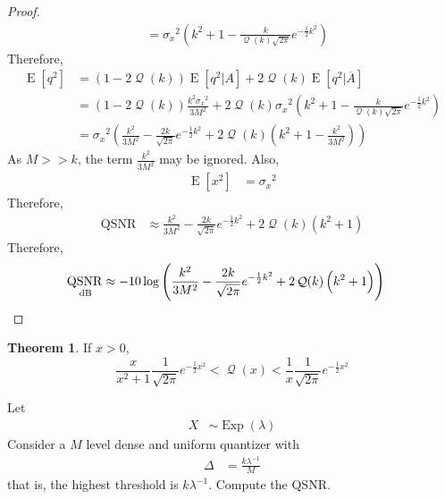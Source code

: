 \documentclass[titlepage, fleqn, a4paper, 12pt, twoside]{article}
\theoremstyle{definition}
\theoremstyle{theorem}
\newtheorem{theorem}{Theorem}
\DeclareMathOperator{\expct}{\mathrm{E}}
\DeclareMathOperator{\exponential}{\mathrm{Exp}}
\DeclareMathOperator{\QSNR}{\mathrm{QSNR}}
\DeclareMathOperator{\Q}{\mathcal{Q}}
\begin{document}
\begin{proof}
\begin{align*}
		&= {\sigma_x}^2 \left( k^2 + 1 - \frac{k}{\Q(k) \sqrt{2 \pi}} e^{-\frac{1}{2} k^2} \right)
	\end{align*}
	Therefore,
	\begin{align*}
		\expct\left[ q^2 \right] &= \left( 1 - 2 \Q(k) \right) \expct\left[ q^2 \Big| A \right] + 2 \Q(k) \expct\left[ q^2 \Big| \overline{A} \right]\\
		&= \left( 1 - 2 \Q(k) \right) \frac{k^2 {\sigma_x}^2}{3 M^2} + 2 \Q(k) {\sigma_x}^2 \left( k^2 + 1 - \frac{k}{\Q(k) \sqrt{2 \pi}} e^{-\frac{1}{2} k^2} \right)\\
		&= {\sigma_x}^2 \left( \frac{k^2}{3 M^2} - \frac{2 k}{\sqrt{2 \pi}} e^{-\frac{1}{2} k^2} + 2 \Q(k) \left( k^2 + 1 - \frac{k^2}{3 M^2} \right) \right)
	\end{align*}
	As $M >> k$, the term $\frac{k^2}{3 M^2}$ may be ignored.
	Also,
	\begin{align*}
		\expct\left[ x^2 \right] &= {\sigma_x}^2
	\end{align*}
	Therefore,
	\begin{align*}
		\QSNR &\approx \frac{k^2}{3 M^2} - \frac{2 k}{\sqrt{2 \pi}} e^{-\frac{1}{2} k^2} + 2 \Q(k) \left( k^2 + 1 \right)
	\end{align*}
	Therefore,
	\begin{align*}
		\QSNR_{\decibel} &\approx -10 \log\left( \frac{k^2}{3 M^2} - \frac{2 k}{\sqrt{2 \pi}} e^{-\frac{1}{2} k^2} + 2 \Q(k) \left( k^2 + 1 \right) \right)
	\end{align*}
\end{proof}

\begin{theorem}
	If $x > 0$,
	\begin{equation*}
		\frac{x}{x^2 + 1} \frac{1}{\sqrt{2 \pi}} e^{-\frac{1}{2} x^2} < \Q(x) < \frac{1}{x} \frac{1}{\sqrt{2 \pi}} e^{-\frac{1}{2} x^2}
	\end{equation*}
\end{theorem}

\begin{question}
	Let
	\begin{align*}
		X &\sim \exponential(\lambda)
	\end{align*}
	Consider a $M$ level dense and uniform quantizer with
	\begin{align*}
		\Delta &= \frac{k \lambda^{-1}}{M}
	\end{align*}
	that is, the highest threshold is $k \lambda^{-1}$.
	Compute the QSNR.
\end{question}
\end{document}
